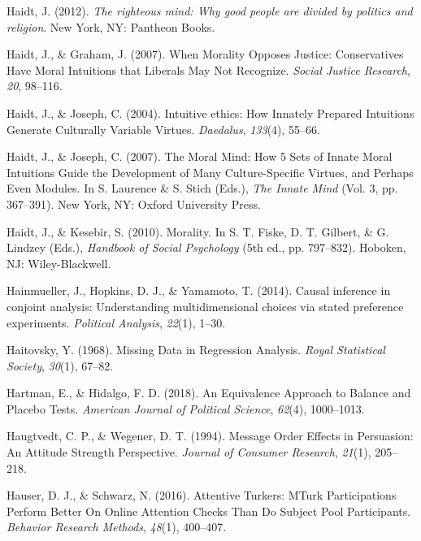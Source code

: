 \documentclass[12pt,econ]{sources/authesis}
\begin{document}
\leavevmode\hypertarget{ref-haidt_2012_righteous}{}%
Haidt, J. (2012). \emph{The righteous mind: Why good people are divided by politics and religion}. New York, NY: Pantheon Books.

\leavevmode\hypertarget{ref-haidt_2007_when}{}%
Haidt, J., \& Graham, J. (2007). When Morality Opposes Justice: Conservatives Have Moral Intuitions that Liberals May Not Recognize. \emph{Social Justice Research}, \emph{20}, 98--116.

\leavevmode\hypertarget{ref-haidt_2004_intuitive}{}%
Haidt, J., \& Joseph, C. (2004). Intuitive ethics: How Innately Prepared Intuitions Generate Culturally Variable Virtues. \emph{Daedalus}, \emph{133}(4), 55--66.

\leavevmode\hypertarget{ref-haidt_2007_moral}{}%
Haidt, J., \& Joseph, C. (2007). The Moral Mind: How 5 Sets of Innate Moral Intuitions Guide the Development of Many Culture-Specific Virtues, and Perhaps Even Modules. In S. Laurence \& S. Stich (Eds.), \emph{The Innate Mind} (Vol. 3, pp. 367--391). New York, NY: Oxford University Press.

\leavevmode\hypertarget{ref-haidt_2010_morality}{}%
Haidt, J., \& Kesebir, S. (2010). Morality. In S. T. Fiske, D. T. Gilbert, \& G. Lindzey (Eds.), \emph{Handbook of Social Psychology} (5th ed., pp. 797--832). Hoboken, NJ: Wiley-Blackwell.

\leavevmode\hypertarget{ref-hainmueller_2014_causal}{}%
Hainmueller, J., Hopkins, D. J., \& Yamamoto, T. (2014). Causal inference in conjoint analysis: Understanding multidimensional choices via stated preference experiments. \emph{Political Analysis}, \emph{22}(1), 1--30.

\leavevmode\hypertarget{ref-haitovsky_1968_missing}{}%
Haitovsky, Y. (1968). Missing Data in Regression Analysis. \emph{Royal Statistical Society}, \emph{30}(1), 67--82.

\leavevmode\hypertarget{ref-hartman_2018_equivalence}{}%
Hartman, E., \& Hidalgo, F. D. (2018). An Equivalence Approach to Balance and Placebo Tests. \emph{American Journal of Political Science}, \emph{62}(4), 1000--1013.

\leavevmode\hypertarget{ref-haugtvedt_1994_message}{}%
Haugtvedt, C. P., \& Wegener, D. T. (1994). Message Order Effects in Persuasion: An Attitude Strength Perspective. \emph{Journal of Consumer Research}, \emph{21}(1), 205--218.

\leavevmode\hypertarget{ref-hauser_attentive_2016}{}%
Hauser, D. J., \& Schwarz, N. (2016). Attentive Turkers: MTurk Participations Perform Better On Online Attention Checks Than Do Subject Pool Participants. \emph{Behavior Research Methods}, \emph{48}(1), 400--407.
\end{document}
